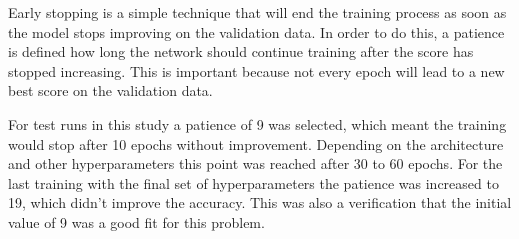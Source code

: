 Early stopping is a simple technique that will end the training process as soon as the model stops improving on the validation data. In order to do this, a patience is defined how long the network should continue training after the score has stopped increasing. This is important because not every epoch will lead to a new best score on the validation data.

For test runs in this study a patience of 9 was selected, which meant the training would stop after 10 epochs without improvement. Depending on the architecture and other hyperparameters this point was reached after 30 to 60 epochs. For the last training with the final set of hyperparameters the patience was increased to 19, which didn't improve the accuracy.  This was also a verification that the initial value of 9 was a good fit for this problem.



\newpage
